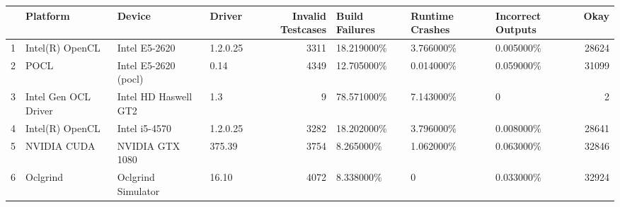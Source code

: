 \begin{tabular}{llllrlllr}
\toprule
{} &              Platform &                Device &    Driver &  Invalid Testcases & Build Failures & Runtime Crashes & Incorrect Outputs &   Okay \\
\midrule
1 &       Intel(R) OpenCL &         Intel E5-2620 &  1.2.0.25 &               3311 &     18.219000\% &       3.766000\% &         0.005000\% &  28624 \\
2 &                  POCL &  Intel E5-2620 (pocl) &      0.14 &               4349 &     12.705000\% &       0.014000\% &         0.059000\% &  31099 \\
3 &  Intel Gen OCL Driver &  Intel HD Haswell GT2 &       1.3 &                  9 &     78.571000\% &       7.143000\% &                 0 &      2 \\
4 &       Intel(R) OpenCL &         Intel i5-4570 &  1.2.0.25 &               3282 &     18.202000\% &       3.796000\% &         0.008000\% &  28641 \\
5 &           NVIDIA CUDA &       NVIDIA GTX 1080 &    375.39 &               3754 &      8.265000\% &       1.062000\% &         0.063000\% &  32846 \\
6 &              Oclgrind &    Oclgrind Simulator &     16.10 &               4072 &      8.338000\% &               0 &         0.033000\% &  32924 \\
\bottomrule
\end{tabular}
